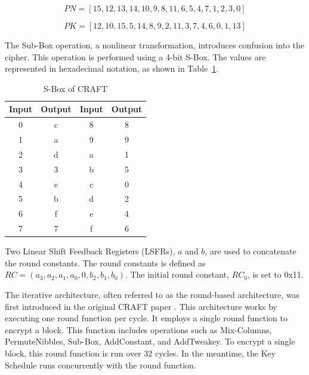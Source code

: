 \documentclass[final,5p,times,twocolumn]{elsarticle}
\begin{document}
\begin{equation}
    PN=[15,12,13,14,10,9,8,11,6,5,4,7,1,2,3,0]
    \label{permute_nibb_eq}
\end{equation}

\begin{equation}
    PK=[12,10,15,5,14,8,9,2,11,3,7,4,6,0,1,13]
    \label{key_schedule_eq}
\end{equation}

The Sub-Box operation, a nonlinear transformation, introduces confusion into the cipher.
This operation is performed using a 4-bit S-Box. The values are represented in hexadecimal notation, as shown in Table~\ref{tab4}.

\begin{table}[h]
    \centering
    \caption{S-Box of CRAFT}\label{tab4}%
    \begin{tabular}{|c|c|c|c|}
        \hline
        Input & Output & Input & Output \\
        \hline
        0     & c      & 8     & 8      \\
        1     & a      & 9     & 9      \\
        2     & d      & a     & 1      \\
        3     & 3      & b     & 5      \\
        4     & e      & c     & 0      \\
        5     & b      & d     & 2      \\
        6     & f      & e     & 4      \\
        7     & 7      & f     & 6      \\
        \hline
    \end{tabular}
\end{table}

Two Linear Shift Feedback Registers (LSFRs), $a$ and $b$, are used to concatenate the round constants.
The round constants is defined as $RC=(a_3,a_2,a_1,a_0,0,b_2,b_1,b_0)$. The initial round constant, $RC_0$, is set to 0x11.


The iterative architecture, often referred to as the round-based architecture, was first introduced in the original CRAFT paper \cite{Beierle2019}. This architecture works by executing one round function per cycle. It employs a single round function to encrypt a block. This function includes operations such as Mix-Columns, PermuteNibbles, Sub-Box, AddConstant, and AddTweakey. To encrypt a single block, this round function is run over 32 cycles. In the meantime, the Key Schedule runs concurrently with the round function.
\end{document}
